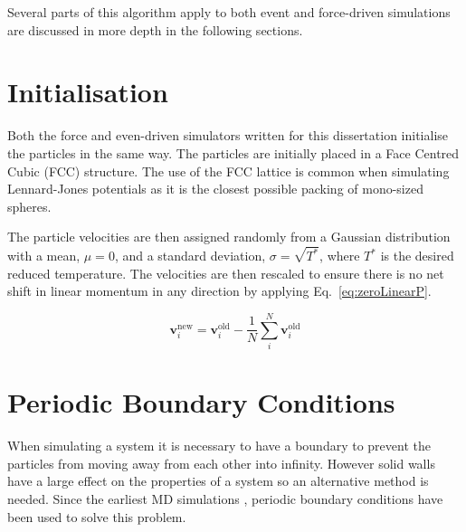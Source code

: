 \documentclass[12pt]{UoAthesis} \usepackage{booktabs}
\begin{document}
Several parts of this algorithm apply to both event and force-driven
simulations are discussed in more depth in the following sections.

\section{Initialisation \label{sec:initMD}} 
Both the force and even-driven simulators written for this
dissertation initialise the particles in the same way. The particles
are initially placed in a Face Centred Cubic (FCC)
 structure. The use of the
FCC lattice is common when simulating Lennard-Jones potentials as it
is the closest possible packing of mono-sized spheres.

The particle velocities are then assigned randomly from a Gaussian
distribution with a mean, $\mu = 0$, and a standard deviation, $\sigma
= \sqrt{T^{*}}$, where $T^{*}$ is the desired reduced temperature. The
velocities are then rescaled to ensure there is no net shift in linear
momentum in any direction by applying Eq.~\eqref{eq:zeroLinearP}.

\begin{equation} 
  \mathbf{v}_{i}^{\text{new}} = \mathbf{v}_{i}^{\text{old}} - \frac{1}{N}
  \sum^{N}_{i}\mathbf{v}_{i}^{\text{old}}
  \label{eq:zeroLinearP} 
\end{equation}

\section{Periodic Boundary Conditions}
When simulating a system it is necessary to have a boundary to prevent
the particles from moving away from each other into infinity.  However
solid walls have a large effect on the properties of a system so an
alternative method is needed.  Since the earliest MD simulations
\cite{Alder1959}, periodic boundary conditions have been used to solve
this problem.
\end{document}
